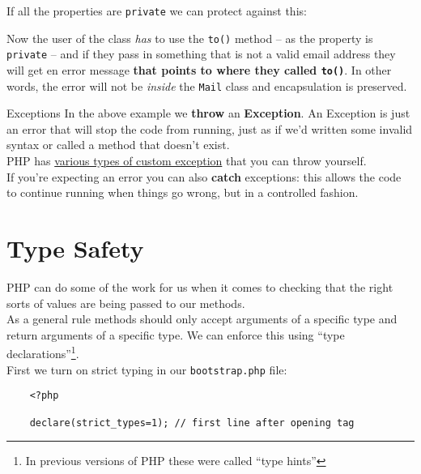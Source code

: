 If all the properties are \texttt{private} we can protect against this:


Now the user of the class \textit{has} to use the \texttt{to()} method – as the property is \texttt{private} – and if they pass in something that is not a valid email address they will get en error message \textbf{that points to where they called \texttt{to()}}. In other words, the error will not be \textit{inside} the \texttt{Mail} class and encapsulation is preserved.

\pagebreak

\begin{infobox}{Exceptions}
    In the above example we \textbf{throw} an \textbf{Exception}. An Exception is just an error that will stop the code from running, just as if we'd written some invalid syntax or called a method that doesn't exist.
    \\

    PHP has \href{https://www.php.net/manual/en/spl.exceptions.php}{various types of custom exception} that you can throw yourself.
    \\

    If you're expecting an error you can also \textbf{catch} exceptions: this allows the code to continue running when things go wrong, but in a controlled fashion.
\end{infobox}


\section{Type Safety}

PHP can do some of the work for us when it comes to checking that the right sorts of values are being passed to our methods.
\\

As a general rule methods should only accept arguments of a specific type and return arguments of a specific type. We can enforce this using ``type declarations''\footnote{In previous versions of PHP these were called ``type hints''}.
\\

First we turn on strict typing in our \texttt{bootstrap.php} file:

\begin{verbatim}
    <?php

    declare(strict_types=1); // first line after opening tag
\end{verbatim}

